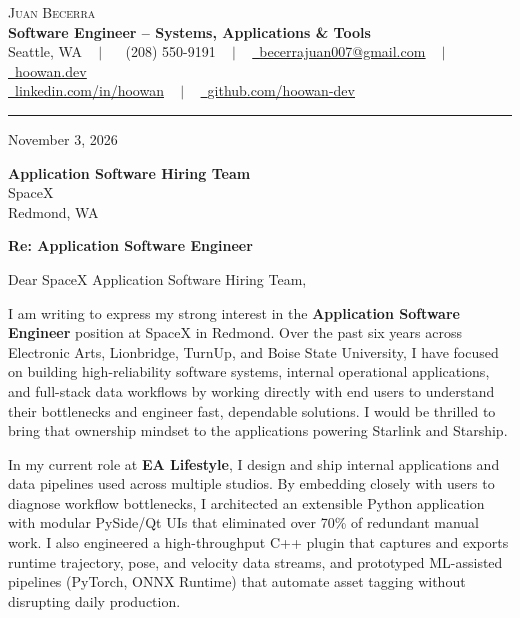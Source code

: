 \documentclass[letterpaper,11pt]{article}
\begin{document}
\begin{center}
    {\Huge \scshape Juan Becerra} \\ \vspace{4pt}
    \textbf{\large Software Engineer -- Systems, Applications \& Tools} \\ \vspace{4pt}
    \small Seattle, WA ~ $|$ ~
    \raisebox{-0.1\height}\faPhone\ (208) 550-9191 ~ $|$ ~
    \href{mailto:becerrajuan007@gmail.com}{\raisebox{-0.2\height}\faEnvelope\ \underline{becerrajuan007@gmail.com}} ~ $|$ ~
    \href{https://hoowan.dev}{\raisebox{-0.2\height}\faGlobe\ \underline{hoowan.dev}} \\ \vspace{2pt}
    \href{https://linkedin.com/in/hoowan/}{\raisebox{-0.2\height}\faLinkedin\ \underline{linkedin.com/in/hoowan}} ~ $|$ ~
    \href{https://github.com/hoowan-dev}{\raisebox{-0.2\height}\faGithub\ \underline{github.com/hoowan-dev}}
\end{center}

\vspace{4pt}
\hrule
\vspace{14pt}

\noindent November 3, 2026

\vspace{8pt}
\noindent \textbf{Application Software Hiring Team} \\
SpaceX \\
Redmond, WA

\vspace{8pt}
\noindent \textbf{Re: Application Software Engineer}

\vspace{8pt}
\noindent Dear SpaceX Application Software Hiring Team,

I am writing to express my strong interest in the \textbf{Application Software Engineer} position at SpaceX
in Redmond. Over the past six years across Electronic Arts, Lionbridge, TurnUp, and Boise State University,
I have focused on building high-reliability software systems, internal operational applications, and full-stack
data workflows by working directly with end users to understand their bottlenecks and engineer fast,
dependable solutions. I would be thrilled to bring that ownership mindset to the applications powering
Starlink and Starship.

In my current role at \textbf{EA Lifestyle}, I design and ship internal applications and data pipelines used
across multiple studios. By embedding closely with users to diagnose workflow bottlenecks, I architected an
extensible Python application with modular PySide/Qt UIs that eliminated over 70\% of redundant manual work.
I also engineered a high-throughput C++ plugin that captures and exports runtime trajectory, pose, and
velocity data streams, and prototyped ML-assisted pipelines (PyTorch, ONNX Runtime) that automate asset
tagging without disrupting daily production.
\end{document}
